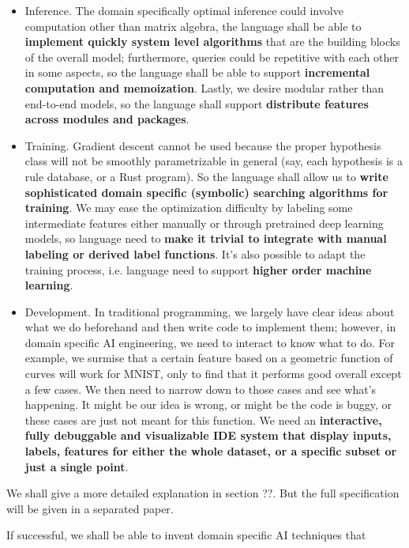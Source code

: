 \documentclass[../main.tex]{subfiles}
\begin{document}
\begin{itemize}
	\item Inference. The domain specifically optimal inference could involve computation other than matrix algebra, the language shall be able to \textbf{implement quickly system level algorithms} that are the building blocks of the overall model; furthermore, queries could be repetitive with each other in some aspects, so the language shall be able to support \textbf{incremental computation and memoization}. Lastly, we desire modular rather than end-to-end models, so the language shall support \textbf{distribute features across modules and packages}. 
	\item Training. Gradient descent cannot be used because the proper hypothesis class will not be smoothly parametrizable in general (say, each hypothesis is a rule database, or a Rust program). So the language shall allow us to \textbf{write sophisticated domain specific (symbolic) searching algorithms for training}. We may ease the optimization difficulty by labeling some intermediate features either manually or through pretrained deep learning models, so language need to \textbf{make it trivial to integrate with manual labeling or derived label functions}. It's also possible to adapt the training process, i.e. language need to support \textbf{higher order machine learning}.
	\item Development. In traditional programming, we largely have clear ideas about what we do beforehand and then write code to implement them; however, in domain specific AI engineering, we need to interact to know what to do. For example, we surmise that a certain feature based on a geometric function of curves will work for MNIST, only to find that it performs good overall except a few cases. We then need to narrow down to those cases and see what's happening. It might be our idea is wrong, or might be the code is buggy, or these cases are just not meant for this function. We need an \textbf{interactive, fully debuggable and visualizable IDE system that display inputs, labels, features for either the whole dataset, or a specific subset or just a single point}.
\end{itemize}

We shall give a more detailed explanation in section ??. But the full specification will be given in a separated paper.

If successful, we shall be able to invent domain specific AI techniques that 
\end{document}

